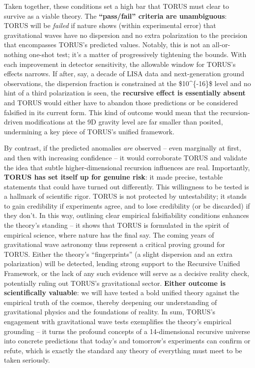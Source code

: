 \documentclass[]{article}
\begin{document}
Taken together, these conditions set a high bar that TORUS must clear to
survive as a viable theory. The \textbf{``pass/fail'' criteria are
unambiguous}: TORUS will be \emph{failed} if nature shows (within
experimental error) that gravitational waves have no dispersion and no
extra polarization to the precision that encompasses TORUS's predicted
values​. Notably, this is not an all-or-nothing one-shot test; it's a
matter of progressively tightening the bounds. With each improvement in
detector sensitivity, the allowable window for TORUS's effects narrows.
If after, say, a decade of LISA data and next-generation ground
observations, the dispersion fraction is constrained at the
\$10\^{}\{-16\}\$ level and no hint of a third polarization is seen, the
\textbf{recursive effect is essentially absent} and TORUS would either
have to abandon those predictions or be considered falsified in its
current form​. This kind of outcome would mean that the recursion-driven
modifications at the 9D gravity level are far smaller than posited,
undermining a key piece of TORUS's unified framework​.

By contrast, if the predicted anomalies \emph{are} observed -- even
marginally at first, and then with increasing confidence -- it would
corroborate TORUS and validate the idea that subtle higher-dimensional
recursion influences are real. Importantly, \textbf{TORUS has set itself
up for genuine risk}: it made precise, testable statements that could
have turned out differently. This willingness to be tested is a hallmark
of scientific rigor. TORUS is not protected by untestability; it stands
to gain credibility if experiments agree, and to lose credibility (or be
discarded) if they don't​. In this way, outlining clear empirical
falsifiability conditions enhances the theory's standing -- it shows
that TORUS is formulated in the spirit of empirical science, where
nature has the final say. The coming years of gravitational wave
astronomy thus represent a critical proving ground for TORUS. Either the
theory's ``fingerprints'' (a slight dispersion and an extra
polarization) will be detected, lending strong support to the Recursive
Unified Framework, or the lack of any such evidence will serve as a
decisive reality check, potentially ruling out TORUS's gravitational
sector. \textbf{Either outcome is scientifically valuable}: we will have
tested a bold unified theory against the empirical truth of the cosmos,
thereby deepening our understanding of gravitational physics and the
foundations of reality. In sum, TORUS's engagement with gravitational
wave tests exemplifies the theory's empirical grounding -- it turns the
profound concepts of a 14-dimensional recursive universe into concrete
predictions that today's and tomorrow's experiments can confirm or
refute, which is exactly the standard any theory of everything must meet
to be taken seriously.​
\end{document}
